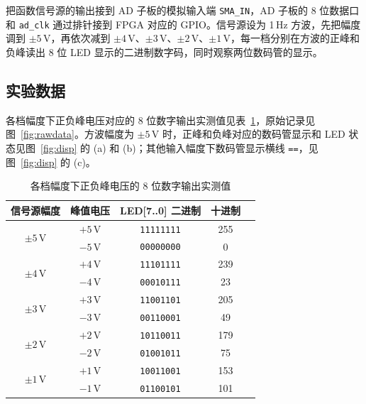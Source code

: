 \documentclass[12pt]{ctexart}
\begin{document}
把函数信号源的输出接到 AD 子板的模拟输入端 \texttt{SMA\_IN}，AD 子板的 8 位数据口和 \texttt{ad\_clk} 通过排针接到 FPGA 对应的 GPIO。信号源设为 1\,Hz 方波，先把幅度调到 $\pm5\,$V，再依次减到 $\pm4\,$V、$\pm3\,$V、$\pm2\,$V、$\pm1\,$V，每一档分别在方波的正峰和负峰读出 8 位 LED 显示的二进制数字码，同时观察两位数码管的显示。

\subsection{实验数据}

各档幅度下正负峰电压对应的 8 位数字输出实测值见表~\ref{tab:data}，原始记录见图~\ref{fig:rawdata}。方波幅度为 $\pm5\,$V 时，正峰和负峰对应的数码管显示和 LED 状态见图~\ref{fig:disp} 的 (a) 和 (b)；其他输入幅度下数码管显示横线 \texttt{==}，见图~\ref{fig:disp} 的 (c)。

\begin{table}[H]
    \centering
    \caption{各档幅度下正负峰电压的 8 位数字输出实测值}
    \label{tab:data}
    \begin{tabular}{ccccc}
        \toprule
        \textbf{信号源幅度} & \textbf{峰值电压} & \textbf{LED[7..0] 二进制} & \textbf{十进制} \\
        \midrule
        \multirow{2}{*}{$\pm5\,$V} & $+5\,$V & \texttt{11111111} & 255 \\
                                   & $-5\,$V & \texttt{00000000} & 0   \\
        \midrule
        \multirow{2}{*}{$\pm4\,$V} & $+4\,$V & \texttt{11101111} & 239 \\
                                   & $-4\,$V & \texttt{00010111} & 23  \\
        \midrule
        \multirow{2}{*}{$\pm3\,$V} & $+3\,$V & \texttt{11001101} & 205 \\
                                   & $-3\,$V & \texttt{00110001} & 49  \\
        \midrule
        \multirow{2}{*}{$\pm2\,$V} & $+2\,$V & \texttt{10110011} & 179 \\
                                   & $-2\,$V & \texttt{01001011} & 75  \\
        \midrule
        \multirow{2}{*}{$\pm1\,$V} & $+1\,$V & \texttt{10011001} & 153 \\
                                   & $-1\,$V & \texttt{01100101} & 101 \\
        \bottomrule
    \end{tabular}
\end{table}
\end{document}
